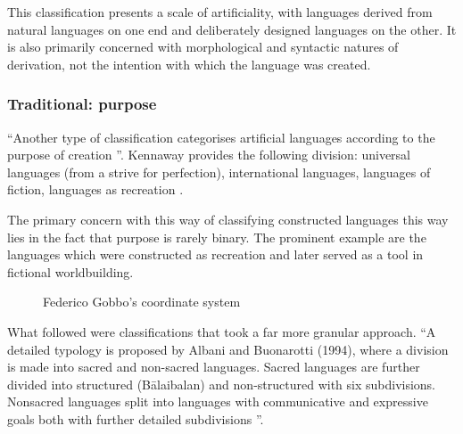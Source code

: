 \documentclass[14pt, a4paper]{extreport}
\begin{document}
This classification presents a scale of artificiality, with languages derived from natural languages on one end and deliberately designed languages on the other. It is also primarily concerned with morphological and syntactic natures of derivation, not the intention with which the language was created.
      \subsubsection{Traditional: purpose}
``Another type of classification categorises artificial languages according to the purpose of creation \parencite[93]{stria}''. Kennaway provides the following division: universal languages (from a strive for perfection), international languages, languages of fiction, languages as recreation \parencite{kennaway}.

The primary concern with this way of classifying constructed languages this way lies in the fact that purpose is rarely binary. The prominent example are the languages which were constructed as recreation and later served as a tool in fictional worldbuilding.

\begin{figure}[ht]%
  \bigskip
  \centering
  \caption{Federico Gobbo's coordinate system}
\end{figure}%

What followed were classifications that took a far more granular approach. ``A detailed typology is proposed by Albani and Buonarotti (1994), where a division is made into sacred and non-sacred languages. Sacred languages are further divided into structured (Bālaibalan) and non-structured with six subdivisions. Nonsacred languages split into languages with communicative and expressive goals both with further detailed subdivisions \parencite[93]{stria}''.
\end{document}
